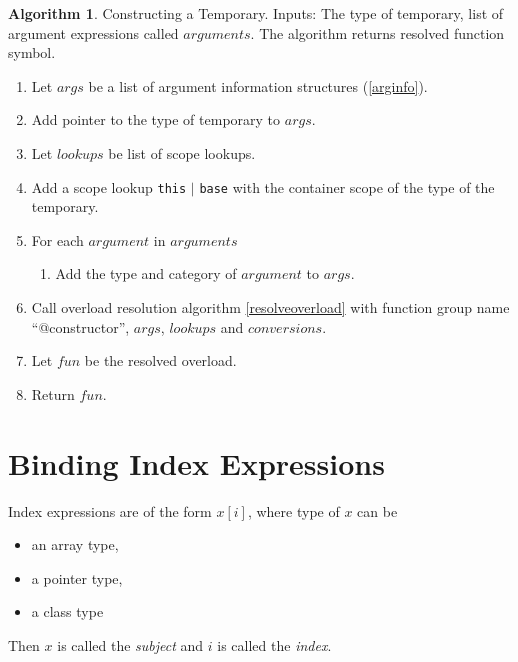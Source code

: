 \documentclass[a4paper,oneside,11pt]{book}
\theoremstyle{definition}
\newtheorem{algo}{Algorithm}[section]
\begin{document}
\begin{algo}\label{bindinvokeconstructtemporary} Constructing a Temporary.
Inputs: The type of temporary, list of argument expressions called $arguments$.
The algorithm returns resolved function symbol.
\begin{enumerate}
\item
Let $args$ be a list of argument information structures (\ref{arginfo}).
\item
Add pointer to the type of temporary to $args$.
\item
Let $lookups$ be list of scope lookups.
\item
Add a scope lookup \verb|this| $|$ \verb|base| with the container scope of the type of the temporary.
\item
For each $argument$ in $arguments$
\begin{enumerate}
\item
Add the type and category of $argument$ to $args$.
\end{enumerate}
\item
Call overload resolution algorithm \ref{resolveoverload} with function group name ``@constructor'', $args$, $lookups$ and $conversions$.
\item
Let $fun$ be the resolved overload.
\item
Return $fun$.
\end{enumerate}
\end{algo}

\section{Binding Index Expressions}

Index expressions are of the form $x[i]$, where type of $x$ can be
\begin{itemize}
\item
an array type,
\item
a pointer type,
\item
a class type
\end{itemize}

Then $x$ is called the \emph{subject} and $i$ is called the \emph{index}.
\end{document}
